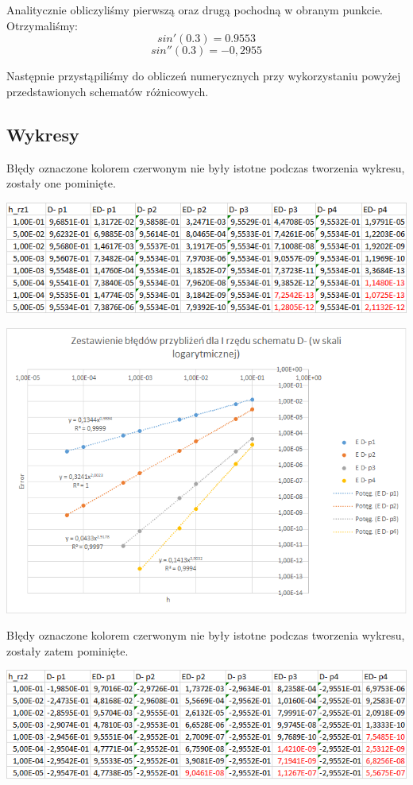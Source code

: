 Analitycznie obliczyliśmy pierwszą oraz drugą pochodną w obranym punkcie. Otrzymaliśmy:
$$sin'(0.3)=0.9553$$
$$sin''(0.3)=-0,2955$$

Następnie przystąpiliśmy do obliczeń numerycznych przy wykorzystaniu powyżej przedstawionych schematów różnicowych.
\newpage
\subsection{Wykresy}
\vspace{0.3cm}
Błędy oznaczone kolorem czerwonym nie były istotne podczas tworzenia wykresu, zostały one pominięte.

\includegraphics{Lab2/charts/rz1_log_Db_dane.png}

\includegraphics{Lab2/charts/rz1_log_Db.png} 
\newpage

Błędy oznaczone kolorem czerwonym nie były istotne podczas tworzenia wykresu, zostały zatem pominięte.

\includegraphics{Lab2/charts/rz2_log_Db_dane.png}

